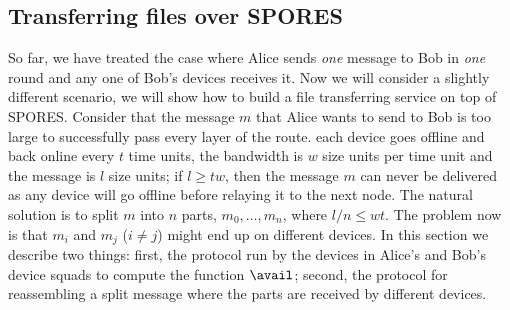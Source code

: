 \subsection{Transferring files over \acs{SPORES}}%
\label{sec:file_exchange}

So far, we have treated the case where Alice sends \emph{one} message to Bob in 
\emph{one} round and any one of Bob's devices receives it.
Now we will consider a slightly different scenario, we will show how to build a 
file transferring service on top of \ac{SPORES}.
Consider that the message \(m\) that Alice wants to send to Bob is too large to 
successfully pass every layer of the route.
\Eg each device goes offline and back online every \(t\) time units, the 
bandwidth is \(w\) size units per time unit and the message is \(l\) size 
units; if \(l\geq t w\), then the message \(m\) can never be delivered as any 
device will go offline before relaying it to the next node.
The natural solution is to split \(m\) into \(n\) parts, \(m_0, \dotsc, m_n\), 
where \(l/n\leq w t\).
The problem now is that \(m_i\) and \(m_j\) (\(i\neq j\)) might end up on 
different devices.
In this section we describe two things:
first, the protocol run by the devices in Alice's and Bob's device squads to 
compute the function \(\avail\);
second, the protocol for reassembling a split message where the parts are 
received by different devices.


